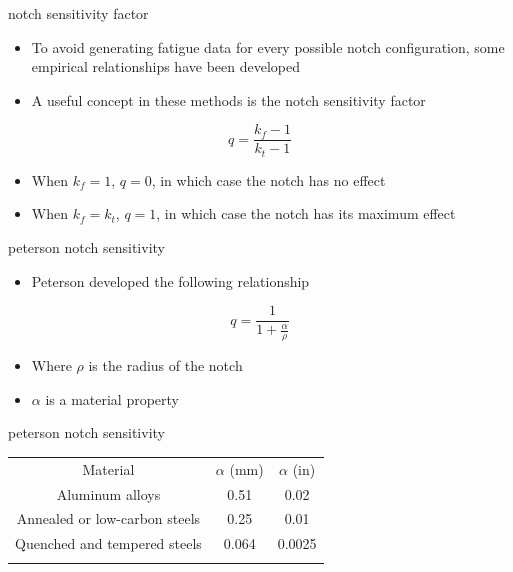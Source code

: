 \documentclass[
  letterpaper,
  ignorenonframetext,
  aspectratio=43,
  handout,
  12pt]{beamer}
\providecommand{\tightlist}{%
  \setlength{\itemsep}{0pt}\setlength{\parskip}{0pt}}
\providecommand{\tightlist}{%
\setlength{\itemsep}{0pt}\setlength{\parskip}{0pt}}
\begin{document}
\begin{frame}{notch sensitivity factor}
\protect\hypertarget{notch-sensitivity-factor}{}
\begin{itemize}
\tightlist
\item
  To avoid generating fatigue data for every possible notch
  configuration, some empirical relationships have been developed
\item
  A useful concept in these methods is the notch sensitivity factor
\end{itemize}

\[q = \frac{k_f - 1}{k_t -1}\]

\begin{itemize}
\tightlist
\item
  When \(k_f = 1\), \(q=0\), in which case the notch has no effect
\item
  When \(k_f = k_t\), \(q=1\), in which case the notch has its maximum
  effect
\end{itemize}
\end{frame}

\begin{frame}{peterson notch sensitivity}
\protect\hypertarget{peterson-notch-sensitivity}{}
\begin{itemize}
\tightlist
\item
  Peterson developed the following relationship
\end{itemize}

\[q = \frac{1}{1+\frac{\alpha}{\rho}}\]

\begin{itemize}
\tightlist
\item
  Where \(\rho\) is the radius of the notch
\item
  \(\alpha\) is a material property
\end{itemize}
\end{frame}

\begin{frame}{peterson notch sensitivity}
\protect\hypertarget{peterson-notch-sensitivity-1}{}
\begin{longtable}[]{@{}ccc@{}}
\toprule
Material & \(\alpha\) (mm) & \(\alpha\) (in) \\ \addlinespace
\midrule
\endhead
Aluminum alloys & 0.51 & 0.02 \\ \addlinespace
Annealed or low-carbon steels & 0.25 & 0.01 \\ \addlinespace
Quenched and tempered steels & 0.064 & 0.0025 \\ \addlinespace
\bottomrule
\end{longtable}
\end{frame}
\end{document}

